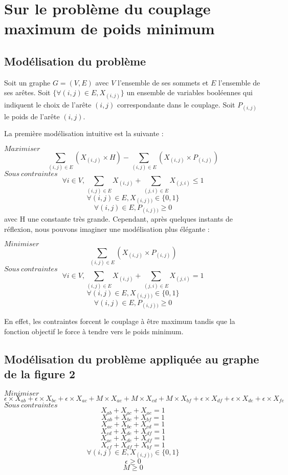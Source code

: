 
\section{Sur le problème du couplage maximum de poids minimum}

\subsection{Modélisation du problème}
Soit un graphe $G = (V,E)$ avec $V$ l'ensemble de ses sommets et $E$ l'ensemble de ses arêtes. Soit $\{ \forall{(i,j) \in E}, X_{(i,j)}\}$ un ensemble de variables booléennes qui indiquent le choix de l'arête $(i,j)$ correspondante dans le couplage. Soit $P_{(i,j)}$ le poids de l'arête $(i,j)$.

La première modélisation intuitive est la suivante :

$ Maximiser $ $$ \sum\limits_{(i,j) \in E} (X_{(i,j)} \times H) - \sum\limits_{(i,j) \in E} (X_{(i,j)} \times P_{(i,j)}) $$
$ Sous\ contraintes $
$$ \forall{i \in V}, \sum\limits_{(i,j) \in E} X_{(i,j)} + \sum\limits_{(j,i) \in E} X_{(j,i)} \leq 1 $$
$$ \forall{(i,j) \in E}, X_{(i,j))} \in \{0,1\} $$
$$ \forall{(i,j) \in E}, P_{(i,j))} \geq 0 $$
avec H une constante très grande. Cependant, après quelques instants de réflexion, nous pouvons imaginer une modélisation plus élégante :

$ Minimiser $ $$ \sum\limits_{(i,j) \in E} (X_{(i,j)} \times P_{(i,j)}) $$
$ Sous\ contraintes $
$$ \forall{i \in V}, \sum\limits_{(i,j) \in E} X_{(i,j)} + \sum\limits_{(j,i) \in E} X_{(j,i)} = 1 $$
$$ \forall{(i,j) \in E}, X_{(i,j))} \in \{0,1\} $$
$$ \forall{(i,j) \in E}, P_{(i,j))} \geq 0 $$

En effet, les contraintes forcent le couplage à être maximum tandis que la fonction objectif le force à tendre vers le poids minimum.

\subsection{Modélisation du problème appliquée au graphe de la figure 2}
$ Minimiser $ $$ \epsilon \times X_{ab} + \epsilon \times X_{bc} + \epsilon \times X_{ac} + M \times X_{ae} + M \times X_{cd} + M \times X_{bf} + \epsilon \times X_{df} + \epsilon \times X_{de} + \epsilon \times X_{fe}$$
$ Sous\ contraintes $
$$ X_{ab} + X_{ac} + X_{ae} = 1 $$
$$ X_{ab} + X_{bc} + X_{bf} = 1 $$
$$ X_{ac} + X_{bc} + X_{cd} = 1 $$
$$ X_{cd} + X_{de} + X_{df} = 1 $$
$$ X_{ae} + X_{de} + X_{df} = 1 $$
$$ X_{ef} + X_{df} + X_{bf} = 1 $$
$$ \forall{(i,j) \in E}, X_{(i,j))} \in \{0,1\} $$
$$ \epsilon \geq 0 $$
$$ M \geq 0 $$

